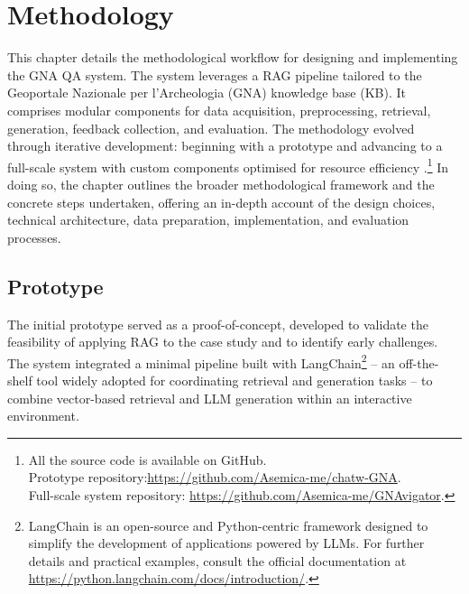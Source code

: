 \chapter{Methodology}
\label{chap:methodology}
\begin{spacing}{1.5}
This chapter details the methodological workflow for designing and implementing the GNA QA system. The system leverages a RAG pipeline tailored to the Geoportale Nazionale per l’Archeologia (GNA) knowledge base (KB). It comprises modular components for data acquisition, preprocessing, retrieval, generation, feedback collection, and evaluation. The methodology evolved through iterative development: beginning with a prototype \citep{pograri_prototype_2025} and advancing to a full-scale system with custom components optimised for resource efficiency \citep{pograri_question-answering_2025}.\footnote{All the source code is available on GitHub.\\Prototype repository:\url{https://github.com/Asemica-me/chatw-GNA}.\\Full-scale system repository: \url{https://github.com/Asemica-me/GNAvigator}.} In doing so, the chapter outlines the broader methodological framework and the concrete steps undertaken, offering an in-depth account of the design choices, technical architecture, data preparation, implementation, and evaluation processes.


\section{Prototype}
The initial prototype served as a proof-of-concept, developed to validate the feasibility of applying RAG to the case study and to identify early challenges. The system integrated a minimal pipeline built with LangChain\footnote{LangChain is an open-source and Python-centric framework designed to simplify the development of applications powered by LLMs. For further details and practical examples, consult the official documentation at \url{https://python.langchain.com/docs/introduction/}.}\nocite{noauthor_langchain_2024} -- an off-the-shelf tool widely adopted for coordinating retrieval and generation tasks \citep{mishra_using_2024,akkiraju_facts_2024} -- to combine vector-based retrieval and LLM generation within an interactive environment.


\end{spacing}
